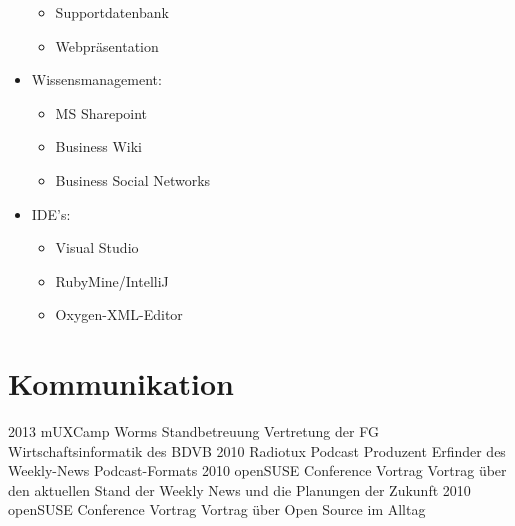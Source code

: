 \documentclass[a4paper,latin]{friggeri-cv} %
\begin{document}
\begin{itemize}
\begin{itemize}
      \item Supportdatenbank \hfill {} \hfill
      \item Webpräsentation \hfill {} \hfill
    \end{itemize}
\item Wissensmanagement:
    \begin{itemize}
      \item MS Sharepoint \hfill {} \hfill
      \item Business Wiki \hfill {} \hfill
      \item Business Social Networks \hfill {} \hfill
    \end{itemize}
\item IDE's:
    \begin{itemize}
      \item Visual Studio \hfill {} \hfill
      \item RubyMine/IntelliJ \hfill {} \hfill
      \item Oxygen-XML-Editor \hfill {} \hfill
    \end{itemize}
\end{itemize}


\section{Kommunikation}

\begin{entrylist}
\entry
{2013}
{mUXCamp Worms}
{Standbetreuung}
{Vertretung der FG Wirtschaftsinformatik des BDVB}
\entry
{2010}
{Radiotux Podcast}
{Produzent}
{Erfinder des Weekly-News Podcast-Formats}
\entry
{2010}
{openSUSE Conference}
{Vortrag}
{Vortrag über den aktuellen Stand der Weekly News und die Planungen der Zukunft}
\entry
{2010}
{openSUSE Conference}
{Vortrag}
{Vortrag über Open Source im Alltag}
\end{entrylist}
\end{document}
